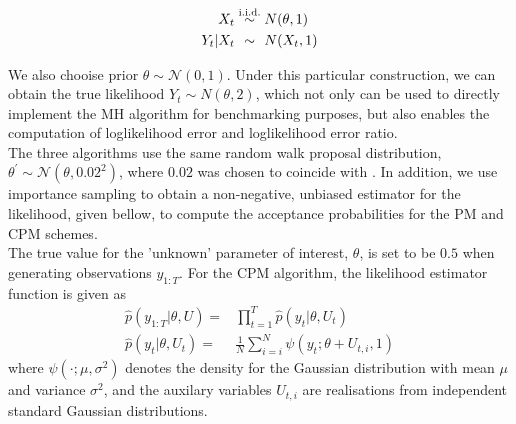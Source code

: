 \documentclass{article}
\begin{document}
  \begin{align*}
  X_t &\overset{\text{i.i.d.}}{\sim} N(\theta, 1) \\
  Y_t | X_t &\overset{\hphantom{\text{i.i.d.}}}{\sim} N(X_t, 1)
  \end{align*}

We also chooise prior $\theta \sim \mathcal{N}(0,1)$. Under this particular construction, we can obtain the true likelihood $Y_t \sim N(\theta, 2)$, which not only can be used to directly implement the MH algorithm for benchmarking purposes, but also enables the computation of loglikelihood error and loglikelihood error ratio.\\


The three algorithms use the same random walk proposal distribution, $ \theta^\prime \sim \mathcal{N}(\theta, 0.02^2)$, where $0.02$ was chosen to coincide with \cite{cpmmDeligiannidis2015}. In addition, we use importance sampling to obtain a non-negative, unbiased estimator for the likelihood, given bellow, to compute the acceptance probabilities for the PM and CPM schemes.\\

The true value for the 'unknown' parameter of interest, $\theta$, is set to be $0.5$ when generating observations $y_{1:T}$. For the CPM algorithm, the likelihood estimator function is given as
\begin{align}
\hat{p}(y_{1:T}| \theta, U) =& \prod_{t=1}^{T} \hat{p}(y_t|\theta, U_t) \\
\hat{p}(y_t| \theta, U_t)=& \frac{1}{N} \sum_{i=i}^N \psi (y_t; \theta + U_{t,i}, 1)
\end{align}
where $\psi(\cdot; \mu, \sigma^2)$ denotes the density for the Gaussian distribution with mean $\mu$ and variance $\sigma^2$, and the auxilary variables $U_{t,i}$ are realisations from independent standard Gaussian distributions.
\end{document}
